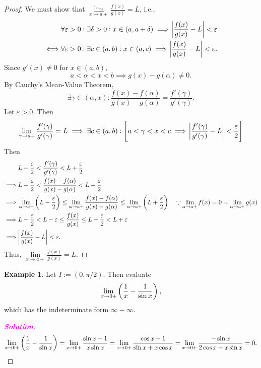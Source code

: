 \documentclass[12pt,openany]{book}
\theoremstyle{definition}
\newtheorem{example}{Example}[chapter]
\newcommand{\ie}{\textnormal{i.e.}}
\newcommand{\sol}{\textcolor{magenta}{\bf Solution}}
\begin{document}
	\begin{proof}
		We must show that $\lim\limits_{x\to a+}\frac{f(x)}{g(x)}=L$, \ie, 
		\begin{align*}
			&\forall\varepsilon>0:\exists\delta>0:x\in(a,a+\delta)\implies\abs{\frac{f(x)}{g(x)}-L}<\varepsilon\\
			\iff&\forall\varepsilon>0:\exists c\in(a,b):x\in(a,c)\implies\abs{\frac{f(x)}{g(x)}-L}<\varepsilon.
		\end{align*}
		Since $g'(x)\neq 0$ for $x\in(a,b)$, \[
		a<\alpha<x<b\implies g(x)-g(\alpha)\neq 0.
		\] By Cauchy's Mean-Value Theorem, \[
		\exists\gamma\in(\alpha,x):\frac{f(x)-f(\alpha)}{g(x)-g(\alpha)}=\frac{f'(\gamma)}{g'(\gamma)}.
		\] Let $\varepsilon>0$. Then \[
		\lim\limits_{\gamma\to a+}\frac{f'(\gamma)}{g'(\gamma)}=L\implies\exists c\in(a,b):\sbr{a<\gamma<x<c\implies\abs{\frac{f'(\gamma)}{g'(\gamma)}-L}<\frac{\varepsilon}{2}}
		\] Then \begin{align*}
			&L-\frac{\varepsilon}{2}<\frac{f'(\gamma)}{g'(\gamma)}<L+\frac{\varepsilon}{2}\\
			\implies &L-\frac{\varepsilon}{2}<\frac{f(x)-f(\alpha)}{g(x)-g(\alpha)}<L+\frac{\varepsilon}{2}\\
			\implies& \lim\limits_{\alpha\to a+}\del{L-\frac{\varepsilon}{2}}\leq\lim\limits_{\alpha\to a+}\frac{f(x)-f(\alpha)}{g(x)-g(\alpha)}\leq\lim\limits_{\alpha\to a+}\del{L+\frac{\varepsilon}{2}}\quad\because \lim\limits_{\alpha\to a+}f(x)=0=\lim\limits_{\alpha\to a+}g(x)\\
			\implies&L-\frac{\varepsilon}{2}<L-\varepsilon\leq\frac{f(x)}{g(x)}\leq L+\frac{\varepsilon}{2}<L+\varepsilon\\
			\implies&\abs{\frac{f(x)}{g(x)}-L}<\varepsilon.
		\end{align*} Thus, $\displaystyle\lim\limits_{x\to a+}\frac{f(x)}{g(x)}=L$.
	\end{proof}
	\vspace{20pt}
	\begin{example}
		Let $I:=(0,\pi/2)$. Then evaluate \[
		\lim\limits_{x\to 0+}\del{\frac{1}{x}-\frac{1}{\sin x}},
		\] which has the indeterminate form $\infty-\infty$.
		\begin{proof}[\sol]
			\[
			\lim\limits_{x\to 0+}\del{\frac{1}{x}-\frac{1}{\sin x}}=\lim\limits_{x\to 0+}\frac{\sin x-1}{x\sin x}=\lim\limits_{x\to 0+}\frac{\cos x-1}{\sin x+x\cos x}=\lim\limits_{x\to 0+}\frac{-\sin x}{2\cos x-x\sin x}=0.
			\]
		\end{proof}
	\end{example}
	\vspace{15pt}
\end{document}
